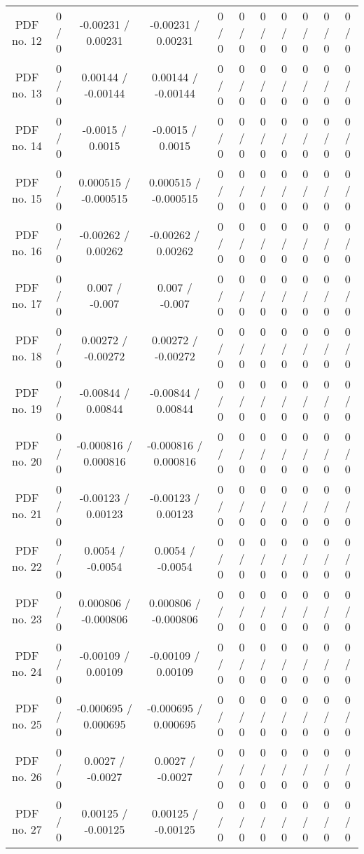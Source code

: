 \begin{table}[htbp]
\begin{center}
\begin{tabular}{|c|c|c|c|c|c|c|c|c|c|c|}
  PDF no. 12 & 0 / 0 & -0.00231 / 0.00231 & -0.00231 / 0.00231 & 0 / 0 & 0 / 0 & 0 / 0 & 0 / 0 & 0 / 0 & 0 / 0 & 0 / 0 \\ 
  PDF no. 13 & 0 / 0 & 0.00144 / -0.00144 & 0.00144 / -0.00144 & 0 / 0 & 0 / 0 & 0 / 0 & 0 / 0 & 0 / 0 & 0 / 0 & 0 / 0 \\ 
  PDF no. 14 & 0 / 0 & -0.0015 / 0.0015 & -0.0015 / 0.0015 & 0 / 0 & 0 / 0 & 0 / 0 & 0 / 0 & 0 / 0 & 0 / 0 & 0 / 0 \\ 
  PDF no. 15 & 0 / 0 & 0.000515 / -0.000515 & 0.000515 / -0.000515 & 0 / 0 & 0 / 0 & 0 / 0 & 0 / 0 & 0 / 0 & 0 / 0 & 0 / 0 \\ 
  PDF no. 16 & 0 / 0 & -0.00262 / 0.00262 & -0.00262 / 0.00262 & 0 / 0 & 0 / 0 & 0 / 0 & 0 / 0 & 0 / 0 & 0 / 0 & 0 / 0 \\ 
  PDF no. 17 & 0 / 0 & 0.007 / -0.007 & 0.007 / -0.007 & 0 / 0 & 0 / 0 & 0 / 0 & 0 / 0 & 0 / 0 & 0 / 0 & 0 / 0 \\ 
  PDF no. 18 & 0 / 0 & 0.00272 / -0.00272 & 0.00272 / -0.00272 & 0 / 0 & 0 / 0 & 0 / 0 & 0 / 0 & 0 / 0 & 0 / 0 & 0 / 0 \\ 
  PDF no. 19 & 0 / 0 & -0.00844 / 0.00844 & -0.00844 / 0.00844 & 0 / 0 & 0 / 0 & 0 / 0 & 0 / 0 & 0 / 0 & 0 / 0 & 0 / 0 \\ 
  PDF no. 20 & 0 / 0 & -0.000816 / 0.000816 & -0.000816 / 0.000816 & 0 / 0 & 0 / 0 & 0 / 0 & 0 / 0 & 0 / 0 & 0 / 0 & 0 / 0 \\ 
  PDF no. 21 & 0 / 0 & -0.00123 / 0.00123 & -0.00123 / 0.00123 & 0 / 0 & 0 / 0 & 0 / 0 & 0 / 0 & 0 / 0 & 0 / 0 & 0 / 0 \\ 
  PDF no. 22 & 0 / 0 & 0.0054 / -0.0054 & 0.0054 / -0.0054 & 0 / 0 & 0 / 0 & 0 / 0 & 0 / 0 & 0 / 0 & 0 / 0 & 0 / 0 \\ 
  PDF no. 23 & 0 / 0 & 0.000806 / -0.000806 & 0.000806 / -0.000806 & 0 / 0 & 0 / 0 & 0 / 0 & 0 / 0 & 0 / 0 & 0 / 0 & 0 / 0 \\ 
  PDF no. 24 & 0 / 0 & -0.00109 / 0.00109 & -0.00109 / 0.00109 & 0 / 0 & 0 / 0 & 0 / 0 & 0 / 0 & 0 / 0 & 0 / 0 & 0 / 0 \\ 
  PDF no. 25 & 0 / 0 & -0.000695 / 0.000695 & -0.000695 / 0.000695 & 0 / 0 & 0 / 0 & 0 / 0 & 0 / 0 & 0 / 0 & 0 / 0 & 0 / 0 \\ 
  PDF no. 26 & 0 / 0 & 0.0027 / -0.0027 & 0.0027 / -0.0027 & 0 / 0 & 0 / 0 & 0 / 0 & 0 / 0 & 0 / 0 & 0 / 0 & 0 / 0 \\ 
  PDF no. 27 & 0 / 0 & 0.00125 / -0.00125 & 0.00125 / -0.00125 & 0 / 0 & 0 / 0 & 0 / 0 & 0 / 0 & 0 / 0 & 0 / 0 & 0 / 0 \\ 

\end{tabular}
\end{center}
\end{table}
